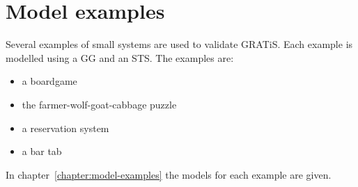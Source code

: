 \section{Model examples}\label{sec:model-examples}

Several examples of small systems are used to validate GRATiS. Each example is modelled using a GG and an STS. The examples are:
\begin{itemize}
\item a boardgame
\item the farmer-wolf-goat-cabbage puzzle
\item a reservation system
\item a bar tab
\end{itemize}

In chapter~\ref{chapter:model-examples} the models for each example are given.
